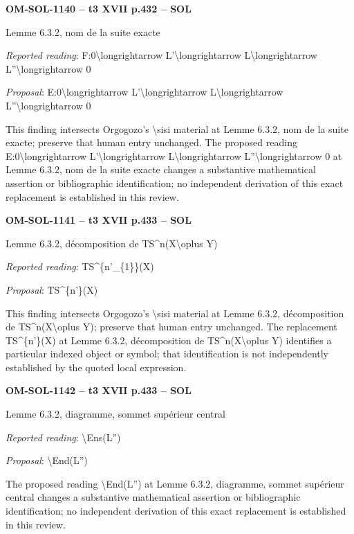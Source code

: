 \par\noindent\textbf{OM-SOL-1140 -- t3 XVII p.432 -- SOL}\par
Lemme 6.3.2, nom de la suite exacte\par
\emph{Reported reading}: F:0\textbackslash{}longrightarrow L'\textbackslash{}longrightarrow L\textbackslash{}longrightarrow L''\textbackslash{}longrightarrow 0\par
\emph{Proposal}: E:0\textbackslash{}longrightarrow L'\textbackslash{}longrightarrow L\textbackslash{}longrightarrow L''\textbackslash{}longrightarrow 0\par
This finding intersects Orgogozo's \textbackslash{}sisi material at Lemme 6.3.2, nom de la suite exacte; preserve that human entry unchanged. The proposed reading E:0\textbackslash{}longrightarrow L'\textbackslash{}longrightarrow L\textbackslash{}longrightarrow L''\textbackslash{}longrightarrow 0 at Lemme 6.3.2, nom de la suite exacte changes a substantive mathematical assertion or bibliographic identification; no independent derivation of this exact replacement is established in this review.\par
\par\noindent\textbf{OM-SOL-1141 -- t3 XVII p.433 -- SOL}\par
Lemme 6.3.2, décomposition de TS\textasciicircum{}n(X\textbackslash{}oplus Y)\par
\emph{Reported reading}: TS\textasciicircum{}\{n'\_\{1\}\}(X)\par
\emph{Proposal}: TS\textasciicircum{}\{n'\}(X)\par
This finding intersects Orgogozo's \textbackslash{}sisi material at Lemme 6.3.2, décomposition de TS\textasciicircum{}n(X\textbackslash{}oplus Y); preserve that human entry unchanged. The replacement TS\textasciicircum{}\{n'\}(X) at Lemme 6.3.2, décomposition de TS\textasciicircum{}n(X\textbackslash{}oplus Y) identifies a particular indexed object or symbol; that identification is not independently established by the quoted local expression.\par
\par\noindent\textbf{OM-SOL-1142 -- t3 XVII p.433 -- SOL}\par
Lemme 6.3.2, diagramme, sommet supérieur central\par
\emph{Reported reading}: \textbackslash{}Ens(L'')\par
\emph{Proposal}: \textbackslash{}End(L'')\par
The proposed reading \textbackslash{}End(L'') at Lemme 6.3.2, diagramme, sommet supérieur central changes a substantive mathematical assertion or bibliographic identification; no independent derivation of this exact replacement is established in this review.\par
